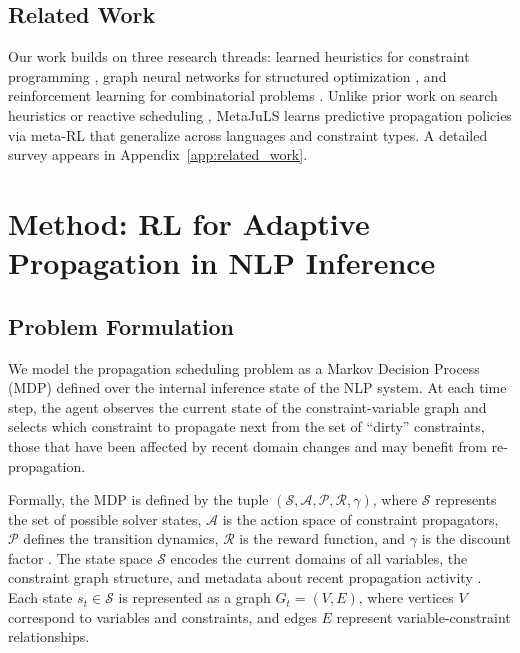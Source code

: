 \documentclass[11pt]{article}
\begin{document}
\subsection{Related Work}

Our work builds on three research threads: learned heuristics for 
constraint programming \citep{gasse2019exact,cappart2021combinatorial}, 
graph neural networks for structured optimization 
\citep{velickovic2018graph,kipf2017semi}, and reinforcement learning 
for combinatorial problems \citep{sutton2018reinforcement,schulman2017proximal}. 
Unlike prior work on search heuristics \citep{gasse2019exact} or reactive 
scheduling \citep{marques2012activity}, MetaJuLS learns predictive propagation 
policies via meta-RL that generalize across languages and constraint types. 
A detailed survey appears in Appendix~\ref{app:related_work}.


\section{Method: RL for Adaptive Propagation in NLP Inference}
\label{sec:method}

\subsection{Problem Formulation}

We model the propagation scheduling problem as a Markov Decision Process (MDP) defined over the internal inference state of the NLP system. At each time step, the agent observes the current state of the constraint-variable graph and selects which constraint to propagate next from the set of ``dirty'' constraints, those that have been affected by recent domain changes and may benefit from re-propagation.

Formally, the MDP is defined by the tuple $(\mathcal{S}, \mathcal{A}, \mathcal{P}, \mathcal{R}, \gamma)$, where $\mathcal{S}$ represents the set of possible solver states, $\mathcal{A}$ is the action space of constraint propagators, $\mathcal{P}$ defines the transition dynamics, $\mathcal{R}$ is the reward function, and $\gamma$ is the discount factor \citep{sutton2018reinforcement}. The state space $\mathcal{S}$ encodes the current domains of all variables, the constraint graph structure, and metadata about recent propagation activity \citep{bessiere2006constraint}. Each state $s_t \in \mathcal{S}$ is represented as a graph $G_t = (V, E)$, where vertices $V$ correspond to variables and constraints, and edges $E$ represent variable-constraint relationships.
\end{document}
